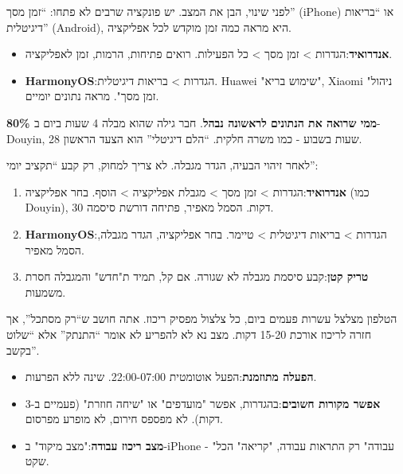 


לפני שינוי, הבן את המצב. יש פונקציה שרבים לא פתחו: “זמן מסך” (iPhone) או “בריאות דיגיטלית” (Android), היא מראה כמה זמן מוקדש לכל אפליקציה.

\begin{itemize}
  \item \textbf{אנדרואיד}:הגדרות > זמן מסך > כל הפעילות. רואים פתיחות, הרמות, זמן לאפליקציה.
  \item \textbf{HarmonyOS}:הגדרות > בריאות דיגיטלית. Huawei "שימוש בריא", Xiaomi "ניהול זמן מסך". מראה נתונים יומיים.
\end{itemize}

\textbf{80\% ממי שרואה את הנתונים לראשונה נבהל}. חבר גילה שהוא מבלה 4 שעות ביום ב-Douyin, 28 שעות בשבוע - כמו משרה חלקית. “הלם דיגיטלי” הוא הצעד הראשון.


לאחר זיהוי הבעיה, הגדר מגבלה. לא צריך למחוק, רק קבע “תקציב יומי”:

\begin{enumerate}
  \item \textbf{אנדרואיד}:הגדרות > זמן מסך > מגבלת אפליקציה > הוסף. בחר אפליקציה (כמו Douyin), 30 דקות. הסמל מאפיר, פתיחה דורשת סיסמה.
  \item \textbf{HarmonyOS}:הגדרות > בריאות דיגיטלית > טיימר. בחר אפליקציה, הגדר מגבלה, הסמל מאפיר.
  \item \textbf{טריק קטן}:קבע סיסמת מגבלה לא שגורה. אם קל, תמיד ת"חדש" והמגבלה חסרת משמעות.
\end{enumerate}


הטלפון מצלצל עשרות פעמים ביום, כל צלצול מפסיק ריכוז. אתה חושב ש“רק מסתכל”, אך חזרה לריכוז אורכת 15-20 דקות. מצב נא לא להפריע לא אומר “התנתק” אלא “שלוט בקשב”.

\begin{itemize}
  \item \textbf{הפעלה מתוזמנת}:הפעל אוטומטית 22:00-07:00. שינה ללא הפרעות.
  \item \textbf{אפשר מקורות חשובים}:בהגדרות, אפשר "מועדפים" או "שיחה חוזרת" (פעמיים ב-3 דקות). לא מפספס חירום, לא מופרע מפרסום.
  \item \textbf{מצב ריכוז עבודה}:"מצב מיקוד" ב-iPhone - "עבודה" רק התראות עבודה, "קריאה" הכל שקט.
\end{itemize}

